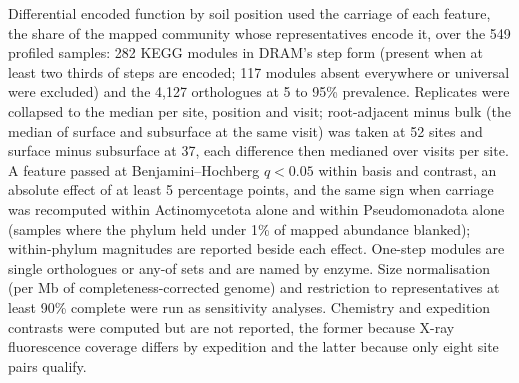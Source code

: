 \documentclass[11pt]{article}
\begin{document}
Differential encoded function by soil position used the carriage of each feature, the share of the
mapped community whose representatives encode it, over the 549 profiled samples: 282 KEGG modules in
DRAM's step form (present when at least two thirds of steps are encoded; 117 modules absent everywhere
or universal were excluded) and the 4{,}127 orthologues at 5 to 95\% prevalence. Replicates were
collapsed to the median per site, position and visit; root-adjacent minus bulk (the median of surface
and subsurface at the same visit) was taken at 52 sites and surface minus subsurface at 37, each
difference then medianed over visits per site. A feature passed at Benjamini--Hochberg $q < 0.05$
within basis and contrast, an absolute effect of at least 5 percentage points, and the same sign when
carriage was recomputed within Actinomycetota alone and within Pseudomonadota alone (samples where
the phylum held under 1\% of mapped abundance blanked); within-phylum magnitudes are reported beside
each effect. One-step modules are single orthologues or any-of sets and are named by enzyme. Size
normalisation (per Mb of completeness-corrected genome) and restriction to representatives at least
90\% complete were run as sensitivity analyses. Chemistry and expedition contrasts were computed but
are not reported, the former because X-ray fluorescence coverage differs by expedition and the latter
because only eight site pairs qualify.

\end{document}
